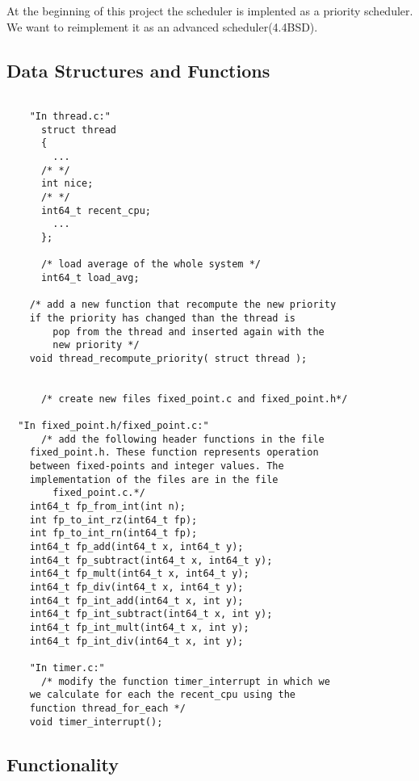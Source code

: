 	At the beginning of this project the scheduler is implented as a priority scheduler. We want to reimplement it as an advanced scheduler(4.4BSD).

    \subsection{Data Structures and Functions}

    \begin{lstlisting}

    "In thread.c:"
      struct thread
      {
	    ...
	  /* */
	  int nice;
	  /* */
	  int64_t recent_cpu;
	    ...
      };

      /* load average of the whole system */
      int64_t load_avg;

    /* add a new function that recompute the new priority
	if the priority has changed than the thread is 
        pop from the thread and inserted again with the
        new priority */
	void thread_recompute_priority( struct thread );


      /* create new files fixed_point.c and fixed_point.h*/
    
  "In fixed_point.h/fixed_point.c:"
      /* add the following header functions in the file
	fixed_point.h. These function represents operation
	between fixed-points and integer values. The 
	implementation of the files are in the file 
        fixed_point.c.*/
	int64_t fp_from_int(int n);
	int fp_to_int_rz(int64_t fp);
	int fp_to_int_rn(int64_t fp);
	int64_t fp_add(int64_t x, int64_t y);
	int64_t fp_subtract(int64_t x, int64_t y);
	int64_t fp_mult(int64_t x, int64_t y);
	int64_t fp_div(int64_t x, int64_t y);
	int64_t fp_int_add(int64_t x, int y);
	int64_t fp_int_subtract(int64_t x, int y);
	int64_t fp_int_mult(int64_t x, int y);
	int64_t fp_int_div(int64_t x, int y);

    "In timer.c:"
      /* modify the function timer_interrupt in which we
	we calculate for each the recent_cpu using the 
	function thread_for_each */
	void timer_interrupt();

    \end{lstlisting}


    \subsection{Functionality}

